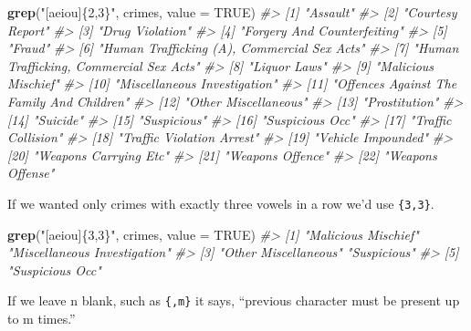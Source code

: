 \documentclass[
  12pt,
]{book}
\newenvironment{Shaded}{\begin{snugshade}}{\end{snugshade}}
\newcommand{\CommentTok}[1]{\textcolor[rgb]{0.37,0.37,0.37}{\textit{#1}}}
\newcommand{\DataTypeTok}[1]{\textcolor[rgb]{0.27,0.27,0.27}{#1}}
\newcommand{\KeywordTok}[1]{\textcolor[rgb]{0.27,0.27,0.27}{\textbf{#1}}}
\newcommand{\NormalTok}[1]{#1}
\newcommand{\OtherTok}[1]{\textcolor[rgb]{0.37,0.37,0.37}{#1}}
\newcommand{\StringTok}[1]{\textcolor[rgb]{0.5,0.5,0.5}{#1}}
\begin{document}
\begin{Shaded}
\begin{Highlighting}[]
\KeywordTok{grep}\NormalTok{(}\StringTok{"[aeiou]\{2,3\}"}\NormalTok{, crimes, }\DataTypeTok{value =} \OtherTok{TRUE}\NormalTok{)}
\CommentTok{\#>  [1] "Assault"                                   }
\CommentTok{\#>  [2] "Courtesy Report"                           }
\CommentTok{\#>  [3] "Drug Violation"                            }
\CommentTok{\#>  [4] "Forgery And Counterfeiting"                }
\CommentTok{\#>  [5] "Fraud"                                     }
\CommentTok{\#>  [6] "Human Trafficking (A), Commercial Sex Acts"}
\CommentTok{\#>  [7] "Human Trafficking, Commercial Sex Acts"    }
\CommentTok{\#>  [8] "Liquor Laws"                               }
\CommentTok{\#>  [9] "Malicious Mischief"                        }
\CommentTok{\#> [10] "Miscellaneous Investigation"               }
\CommentTok{\#> [11] "Offences Against The Family And Children"  }
\CommentTok{\#> [12] "Other Miscellaneous"                       }
\CommentTok{\#> [13] "Prostitution"                              }
\CommentTok{\#> [14] "Suicide"                                   }
\CommentTok{\#> [15] "Suspicious"                                }
\CommentTok{\#> [16] "Suspicious Occ"                            }
\CommentTok{\#> [17] "Traffic Collision"                         }
\CommentTok{\#> [18] "Traffic Violation Arrest"                  }
\CommentTok{\#> [19] "Vehicle Impounded"                         }
\CommentTok{\#> [20] "Weapons Carrying Etc"                      }
\CommentTok{\#> [21] "Weapons Offence"                           }
\CommentTok{\#> [22] "Weapons Offense"}
\end{Highlighting}
\end{Shaded}

If we wanted only crimes with exactly three vowels in a row we'd use \texttt{\{3,3\}}.

\begin{Shaded}
\begin{Highlighting}[]
\KeywordTok{grep}\NormalTok{(}\StringTok{"[aeiou]\{3,3\}"}\NormalTok{, crimes, }\DataTypeTok{value =} \OtherTok{TRUE}\NormalTok{)}
\CommentTok{\#> [1] "Malicious Mischief"          "Miscellaneous Investigation"}
\CommentTok{\#> [3] "Other Miscellaneous"         "Suspicious"                 }
\CommentTok{\#> [5] "Suspicious Occ"}
\end{Highlighting}
\end{Shaded}

If we leave n blank, such as \texttt{\{,m\}} it says, ``previous character must be present up to m times.''
\end{document}

